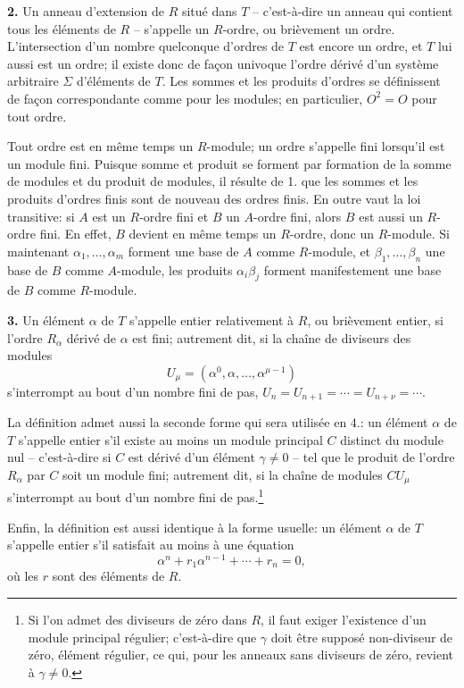 \textbf{2.} Un anneau d'extension de $R$ situé dans $T$ -- c'est-à-dire un anneau qui contient tous les éléments de $R$ -- s'appelle un $R$-ordre, ou brièvement un ordre. L'intersection d'un nombre quelconque d'ordres de $T$ est encore un ordre, et $T$ lui aussi est un ordre; il existe donc de façon univoque l'ordre dérivé d'un système arbitraire $\Sigma$ d'éléments de $T$. Les sommes et les produits d'ordres se définissent de façon correspondante comme pour les modules; en particulier, $O^2=O$ pour tout ordre.

Tout ordre est en même temps un $R$-module; un ordre s'appelle fini lorsqu'il est un module fini. Puisque somme et produit se forment par formation de la somme de modules et du produit de modules, il résulte de 1. que les sommes et les produits d'ordres finis sont de nouveau des ordres finis. En outre vaut la loi transitive: si $A$ est un $R$-ordre fini et $B$ un $A$-ordre fini, alors $B$ est aussi un $R$-ordre fini. En effet, $B$ devient en même temps un $R$-ordre, donc un $R$-module. Si maintenant $\alpha_1,\ldots,\alpha_m$ forment une base de $A$ comme $R$-module, et $\beta_1,\ldots,\beta_n$ une base de $B$ comme $A$-module, les produits $\alpha_i\beta_j$ forment manifestement une base de $B$ comme $R$-module.

\textbf{3.} Un élément $\alpha$ de $T$ s'appelle entier relativement à $R$, ou brièvement entier, si l'ordre $R_\alpha$ dérivé de $\alpha$ est fini; autrement dit, si la chaîne de diviseurs des modules
\[
        U_\mu=(\alpha^0,\alpha,\ldots,\alpha^{\mu-1})
\]
s'interrompt au bout d'un nombre fini de pas, $U_n=U_{n+1}=\cdots=U_{n+\nu}=\cdots$.

La définition admet aussi la seconde forme qui sera utilisée en 4.: un élément $\alpha$ de $T$ s'appelle entier s'il existe au moins un module principal $C$ distinct du module nul -- c'est-à-dire si $C$ est dérivé d'un élément $\gamma\ne0$ -- tel que le produit de l'ordre $R_\alpha$ par $C$ soit un module fini; autrement dit, si la chaîne de modules $CU_\mu$ s'interrompt au bout d'un nombre fini de pas.\footnote{Si l'on admet des diviseurs de zéro dans $R$, il faut exiger l'existence d'un module principal régulier; c'est-à-dire que $\gamma$ doit être supposé non-diviseur de zéro, élément régulier, ce qui, pour les anneaux sans diviseurs de zéro, revient à $\gamma\ne0$.}

Enfin, la définition est aussi identique à la forme usuelle: un élément $\alpha$ de $T$ s'appelle entier s'il satisfait au moins à une équation
\[
        \alpha^n+r_1\alpha^{n-1}+\cdots+r_n=0,
\]
où les $r$ sont des éléments de $R$.

